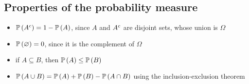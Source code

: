 \subsection{Properties of the probability measure}
\begin{itemize}
	\item \(\mathbb{P}\left({{A}^c}\right) = 1 - \mathbb{P}\left({A}\right)\), since \(A\) and \({A}^c\) are disjoint sets, whose union is \(\Omega\)
	\item \(\mathbb{P}\left({\varnothing}\right) = 0\), since it is the complement of \(\Omega\)
	\item if \(A \subseteq B\), then \(\mathbb{P}\left({A}\right) \leq \mathbb{P}\left({B}\right)\)
	\item \(\mathbb{P}\left({A \cup B}\right) = \mathbb{P}\left({A}\right) + \mathbb{P}\left({B}\right) - \mathbb{P}\left({A \cap B}\right)\) using the inclusion-exclusion theorem
\end{itemize}

